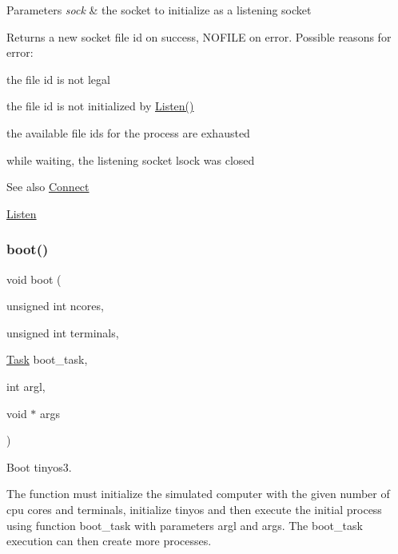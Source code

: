 \begin{DoxyParams}{Parameters}
{\em sock} & the socket to initialize as a listening socket \\
\hline
\end{DoxyParams}
\begin{DoxyReturn}{Returns}
a new socket file id on success, {\ttfamily N\+O\+F\+I\+LE} on error. Possible reasons for error\+:
\begin{DoxyItemize}
\item the file id is not legal
\item the file id is not initialized by {\ttfamily \hyperlink{group__syscalls_ga9ff5bae3e7b9e5bbf5a788a5ff739bf7}{Listen()}} 
\item the available file ids for the process are exhausted
\item while waiting, the listening socket {\ttfamily lsock} was closed
\end{DoxyItemize}
\end{DoxyReturn}
\begin{DoxySeeAlso}{See also}
\hyperlink{group__syscalls_ga747ceadd43e9a4c72b08fffbadaefbdd}{Connect} 

\hyperlink{group__syscalls_ga9ff5bae3e7b9e5bbf5a788a5ff739bf7}{Listen} 
\end{DoxySeeAlso}
\mbox{\label{group__syscalls_ga31d9ee7df9665928617a9f9c0cc6d361}} 
\subsubsection{\texorpdfstring{boot()}{boot()}}
{\footnotesize\ttfamily void boot (\begin{DoxyParamCaption}\item[{unsigned int}]{ncores,  }\item[{unsigned int}]{terminals,  }\item[{\hyperlink{group__syscalls_gaec3f2f835e105271fbbc00272c0ba984}{Task}}]{boot\+\_\+task,  }\item[{int}]{argl,  }\item[{void $\ast$}]{args }\end{DoxyParamCaption})}



Boot tinyos3. 

The function must initialize the simulated computer with the given number of cpu cores and terminals, initialize tinyos and then execute the initial process using function boot\+\_\+task with parameters argl and args. The boot\+\_\+task execution can then create more processes.

